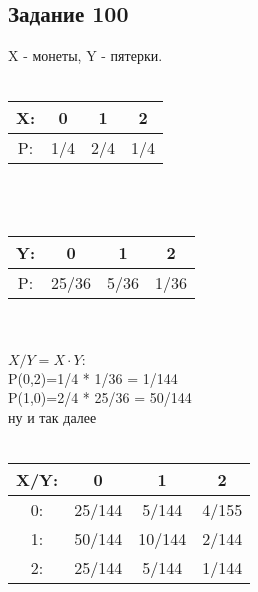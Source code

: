 \documentclass[12pt]{article}
\begin{document}
\subsection{Задание 100}
X - монеты, Y - пятерки.\\
\\
\begin{tabular}{|c|c|c|c|}
\hline
X: & 0 & 1& 2  \\
\hline
P: & 1/4 & 2/4 & 1/4 \\
\hline
\end{tabular}
\\
\\
\begin{tabular}{|c|c|c|c|}
\hline
Y: & 0 & 1& 2  \\
\hline
P: & 25/36 & 5/36 & 1/36 \\
\hline
\end{tabular}
\\
\\
$X/Y=X\cdot Y:$\\
P(0,2)=1/4 * 1/36 = 1/144\\
P(1,0)=2/4 * 25/36 = 50/144\\
ну и так далее\\
\\
\begin{tabular}{|c|c|c|c|}
\hline
X/Y: & 0 & 1 & 2 \\
\hline
0: & 25/144 & 5/144 & 4/155 \\
\hline
1: & 50/144 & 10/144 & 2/144 \\
\hline
2: & 25/144 & 5/144 & 1/144 \\
\hline
\end{tabular}
\\
\newpage
\end{document}
